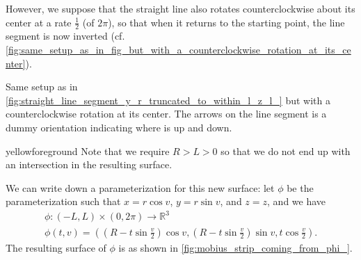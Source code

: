 \documentclass[notoc,notitlepage]{tufte-book}
\begin{document}
\begin{eg}
  However, we suppose that the straight line also rotates counterclockwise
  about its center at a rate $\frac{1}{2}$ (of $2 \pi$), so that when it returns to the
  starting point, the line segment is now inverted (cf.
  \cref{fig:same_setup_as_in_fig_but_with_a_counterclockwise_rotation_at_its_center}).
  \begin{marginfigure}[50pt]
    \centering
    \caption{Same setup as in \cref{fig:straight_line_segment_y_r_truncated_to_within_l_z_l_} but with a counterclockwise rotation at its center. The arrows on the line segment is a dummy orientation indicating where is up and down.}\label{fig:same_setup_as_in_fig_but_with_a_counterclockwise_rotation_at_its_center}
  \end{marginfigure}
  \begin{quotebox}{yellow}{foreground}
  Note that we require $R > L > 0$ so that we do not end up with an intersection
  in the resulting surface.
  \end{quotebox}
  We can write down a parameterization for this new surface: let $\phi$ be the
  parameterization such that $x = r \cos v$, $y = r \sin v$, and $z = z$, and we
  have
  \begin{gather*}
    \phi : (-L, L) \times (0, 2 \pi) \to \mathbb{R}^3 \\
    \phi(t, v) = \left(\left(R - t \sin \frac{v}{2}\right) \cos v, \left(R - t
    \sin \frac{v}{2}\right) \sin v, t \cos \frac{v}{2}\right).
  \end{gather*}
  The resulting surface of $\phi$ is as shown in
  \cref{fig:mobius_strip_coming_from_phi_}.
  \begin{figure}[ht]

\end{figure}
\end{eg}
\end{document}

